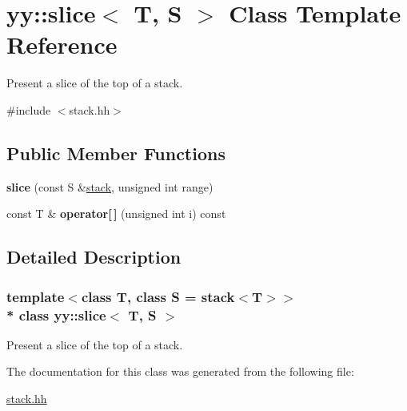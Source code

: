 \hypertarget{classyy_1_1slice}{}\section{yy\+:\+:slice$<$ T, S $>$ Class Template Reference}
\label{classyy_1_1slice}


Present a slice of the top of a stack.  




{\ttfamily \#include $<$stack.\+hh$>$}

\subsection*{Public Member Functions}
\begin{DoxyCompactItemize}
\item 
{\bfseries slice} (const S \&\hyperlink{classyy_1_1stack}{stack}, unsigned int range)\hypertarget{classyy_1_1slice_a09b1750a81ae90227fdceb482fa06797}{}\label{classyy_1_1slice_a09b1750a81ae90227fdceb482fa06797}

\item 
const T \& {\bfseries operator\mbox{[}$\,$\mbox{]}} (unsigned int i) const \hypertarget{classyy_1_1slice_ad44e52c28c2962f9dd5bf327510c1237}{}\label{classyy_1_1slice_ad44e52c28c2962f9dd5bf327510c1237}

\end{DoxyCompactItemize}


\subsection{Detailed Description}
\subsubsection*{template$<$class T, class S = stack$<$\+T$>$$>$\\*
class yy\+::slice$<$ T, S $>$}

Present a slice of the top of a stack. 

The documentation for this class was generated from the following file\+:\begin{DoxyCompactItemize}
\item 
\hyperlink{stack_8hh}{stack.\+hh}\end{DoxyCompactItemize}

